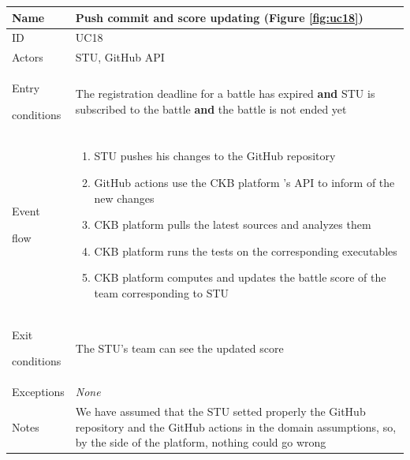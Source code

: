 \begin{center}
    \def\arraystretch{1.5}
    \begin{tabular}{| m{2cm} | m{10cm}|}
        \hline
        Name                  & Push commit and score updating (Figure \ref{fig:uc18})                                                                                                                       \\ \hline
        ID                    & UC18                                                                                                                                                                         \\ \hline
        Actors                & STU, GitHub API                                                                     \\ \hline
        Entry \par conditions & The registration deadline for a battle has expired \textbf{and} STU is subscribed to the battle \textbf{and} the battle is not ended yet                                     \\ \hline
        Event \par flow       & \begin{enumerate}
                                    \item STU pushes his changes to the GitHub repository
                                    \item GitHub actions use the CKB platform 's API to inform of the new changes
                                    \item CKB platform pulls the latest sources and analyzes them
                                    \item CKB platform runs the tests on the corresponding executables
                                    \item CKB platform computes and updates the battle score of the team corresponding to STU
                                \end{enumerate}                                                                                     \\ \hline
        Exit \par conditions  & The STU's team can see the updated score                                                                                                                                     \\ \hline
        Exceptions            & \textit{None}                                                                                                                                                                \\ \hline
        Notes                 & We have assumed that the STU setted properly the GitHub repository and the GitHub actions in the domain assumptions, so, by the side of the platform, nothing could go wrong \\ \hline
    \end{tabular}
\end{center}

